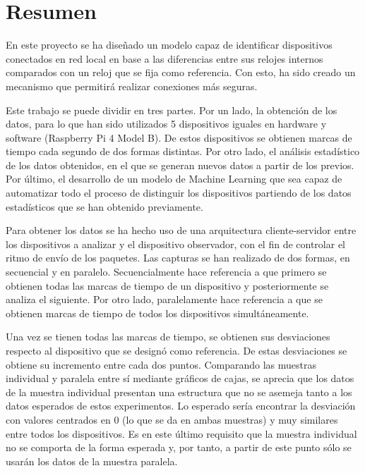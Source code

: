 
\chapter*{Resumen}
 \label{chap:resumen}

En este proyecto se ha diseñado un modelo capaz de identificar dispositivos conectados en red local en base a las diferencias entre sus relojes internos comparados con un reloj que se fija como referencia. Con esto, ha sido creado un mecanismo que permitirá realizar conexiones más seguras.

Este trabajo se puede dividir en tres partes. Por un lado, la obtención de los datos, para lo que han sido utilizados 5 dispositivos iguales en hardware y software (Raspberry Pi 4 Model B). De estos dispositivos se obtienen marcas de tiempo cada segundo de dos formas distintas. Por otro lado, el análisis estadístico de los datos obtenidos, en el que se generan nuevos datos a partir de los previos. Por último, el desarrollo de un modelo de Machine Learning que sea capaz de automatizar todo el proceso de distinguir los dispositivos partiendo de los datos estadísticos que se han obtenido previamente.

Para obtener los datos se ha hecho uso de una arquitectura cliente-servidor entre los dispositivos a analizar y el dispositivo observador, con el fin de controlar el ritmo de envío de los paquetes. Las capturas se han realizado de dos formas, en secuencial y en paralelo. Secuencialmente hace referencia a que primero se obtienen todas las marcas de tiempo de un dispositivo y posteriormente se analiza el siguiente. Por otro lado, paralelamente hace referencia a que se obtienen marcas de tiempo de todos los dispositivos simultáneamente.

Una vez se tienen todas las marcas de tiempo, se obtienen sus desviaciones respecto al dispositivo que se designó como referencia. De estas desviaciones se obtiene su incremento entre cada dos puntos. Comparando las muestras individual y paralela entre sí mediante gráficos de cajas, se aprecia que los datos de la muestra individual presentan una estructura que no se asemeja tanto a los datos esperados de estos experimentos. Lo esperado sería encontrar la desviación con valores centrados en 0 (lo que se da en ambas muestras) y muy similares entre todos los dispositivos. Es en este último requisito que la muestra individual no se comporta de la forma esperada y, por tanto, a partir de este punto sólo se usarán los datos de la muestra paralela.

